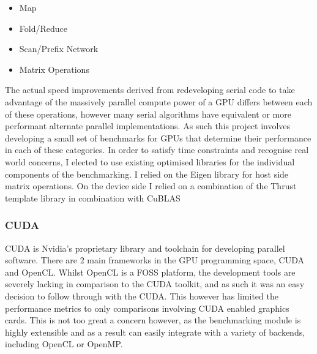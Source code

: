 \begin{itemize} 
    \item Map 
    \item Fold/Reduce 
    \item Scan/Prefix Network 
    \item Matrix Operations
\end{itemize}

The actual speed improvements derived from redeveloping serial code to take advantage of the
massively parallel compute power of a GPU differs between each of these operations, however many
serial algorithms have equivalent or more performant alternate parallel implementations. As such
this project involves developing a small set of benchmarks for GPUs that determine their
performance in each of these categories. In order to satisfy time constraints and recognise real
world concerns, I elected to use existing optimised libraries for the individual components of the
benchmarking. I relied on the Eigen library\cite{eigen} for host side matrix operations. On the
device side I relied on a combination of the Thrust template library\cite{thrust} in combination
with CuBLAS\cite{cublas}

\subsubsection{CUDA} 
CUDA is Nvidia's proprietary library and toolchain for developing parallel software. There are 2
main frameworks in the GPU programming space, CUDA and OpenCL. Whilst OpenCL is a FOSS platform, the
development tools are severely lacking in comparison to the CUDA toolkit, and as such it was an easy
decision to follow through with the CUDA. This however has limited the performance metrics to only
comparisons involving CUDA enabled graphics cards. This is not too great a concern however, as the
benchmarking module is highly extensible and as a result can easily integrate with a variety of
backends, including OpenCL or OpenMP.
